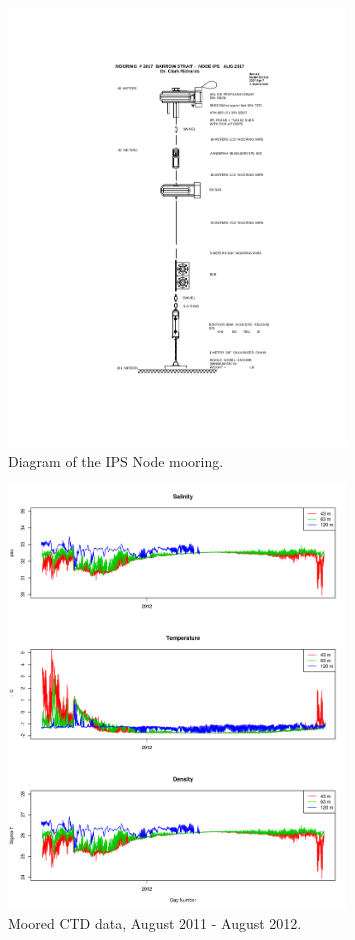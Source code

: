 \documentclass[12pt]{dforeport}
\begin{document}
\begin{figure}
\centering
\includegraphics[width = 0.8\textwidth]{./figures/IPS.png}
\caption[Mooring Diagram: IPS node]{Diagram of the IPS Node mooring.}
\label{f:md_ips}
\end{figure}



\begin{figure}
\centering
\includegraphics[width = 0.8\textwidth]{./figures/05_mctd_2011_2012.png}
\caption[Moored CTD, August 2011-2012]{Moored CTD data, August 2011 - August 2012.}
\label{f:mctd_2011_2012}
\end{figure}
\end{document}

